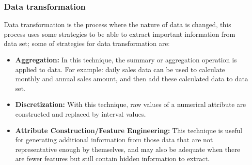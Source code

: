 \subsubsection{Data transformation}
\label{subsubsection:est-norm-dataset}

Data transformation is the process where the nature of data is changed, this process uses some strategies to be able to extract important information from data set; some of strategies for data transformation are:

\begin{itemize}
\item \textbf{Aggregation:} In this technique, the summary or aggregation operation is applied to data. For example: daily sales data can be used to calculate monthly and annual sales amount, and then add these calculated data to data set.

\item \textbf{Discretization:} With this technique, raw values of a numerical attribute are constructed and replaced by interval values.

\item \textbf{Attribute Construction/Feature Engineering:} This technique is useful for generating additional information from those data that are not representative enough by themselves, and may also be adequate when there are fewer features but still contain hidden information to extract.


\end{itemize}
